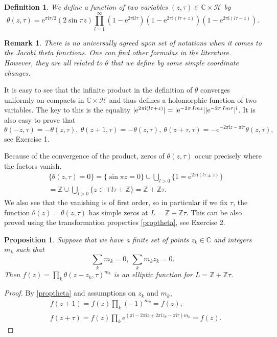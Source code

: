 \documentclass[11pt]{article}
\numberwithin{equation}{section}
\numberwithin{footnote}{section}
\newtheorem{prop}[thm]{Proposition}
\newtheorem{defn}[thm]{Definition}
\newtheorem{rem}[thm]{Remark}
\newcommand{\ee}{{\mathrm e}}
\newcommand{\ii}{{\mathrm i}}
\newcommand{\Z}{{\mathbb Z}}
\newcommand{\C}{{\mathbb C}}
\begin{document}
\smallskip
\begin{defn}\label{theta}
We define a function of two variables $(z,\tau)\in \C\times \mathcal H$ by
$$
\theta(z,\tau) = \ee^{\pi \ii \tau /2} (2\sin \pi z) \prod_{l=1}^{\infty}(1-\ee^{2\pi\ii l\tau})
(1-\ee^{2\pi\ii (l\tau+z)})(1-\ee^{2\pi\ii (l\tau-z)}).
$$
\end{defn}

\smallskip
\begin{rem}
There is no universally agreed upon set of notations when it comes to the Jacobi theta functions. One can find other formulas in the literature. However, they are all related to $\theta$ that we define by some simple coordinate changes.
\end{rem}

It is easy to see that the infinite product in the definition of $\theta$ converges uniformly on compacts in $\C\times \mathcal H$ and thus defines a holomorphic function of two variables. The key to this is the equality $|\ee^{2\pi\ii(l\tau +z)}| = |\ee^{-2\pi\, {\rm  Im} z }||\ee^{-2\pi\, {\rm Im} \tau }|^l$. 
It is also easy to prove that 
\begin{equation}\label{proptheta}
\theta(-z,\tau) = -\theta(z,\tau),~
\theta(z+1,\tau) = -\theta(z,\tau),~
\theta(z+\tau,\tau) = -\ee^{-2\pi\ii z - \pi \ii \tau} \theta(z,\tau),
\end{equation}
see Exercise 1.

\smallskip
Because of the convergence of the product, zeros of $\theta(z,\tau)$ occur precisely where the factors vanish.
\begin{align*}
&\{\theta(z,\tau)=0\} = \{\sin \pi z = 0\} \cup \bigcup_{l>0} \{1=\ee^{2\pi\ii(l\tau \pm z)}\} 
\\
&= \Z \cup \bigcup_{l>0} \{z \in \mp l\tau+\Z\} =\Z+\Z\tau.
\end{align*}
We also see that the vanishing is of first order, so in particular if we fix $\tau$, the function $\theta(z) = \theta(z,\tau)$ has simple zeros at $L=\Z+\Z\tau$. This can be also proved using the transformation properties \eqref{proptheta}, see Exercise 2. 

\smallskip
\begin{prop}\label{findf}
Suppose that we have a finite set of points $z_k \in \C$  and integers $m_k$ such that 
$$
\sum_k{m_k}=0,~\sum_k{m_k z_k} = 0.
$$
Then
$f(z) = \prod_{k} \theta(z-z_k,\tau)^{m_k}$ is an elliptic function for $L=\Z+\Z\tau$.
\end{prop}

\begin{proof}
By \eqref{proptheta} and assumptions on $z_k$ and $m_k$,
\begin{align*}
&f(z+1) = f(z) \prod_k (-1)^{ m_k}  = f(z),\\
&f(z+\tau) = f(z) \prod_k \ee^{(\pi\ii - 2\pi\ii z + 2\pi\ii z_k -\pi\ii\tau)m_k}
=f(z).
\end{align*}
\end{proof}
\end{document}
